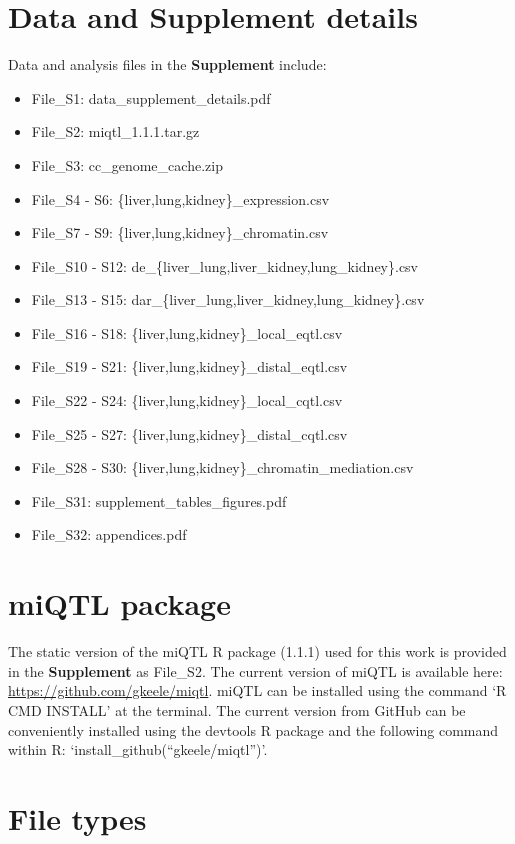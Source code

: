 \documentclass[10pt,letterpaper,twoside]{article}
\begin{document}
\section*{Data and Supplement details}

Data and analysis files in the \textbf{Supplement} include:

\begin{itemize}
	\item File\_S1: data\_supplement\_details.pdf
	\item File\_S2: miqtl\_1.1.1.tar.gz
	\item File\_S3: cc\_genome\_cache.zip
	\item File\_S4 - S6: \{liver,lung,kidney\}\_expression.csv
	\item File\_S7 - S9: \{liver,lung,kidney\}\_chromatin.csv
	\item File\_S10 - S12: de\_\{liver\_lung,liver\_kidney,lung\_kidney\}.csv
	\item File\_S13 - S15: dar\_\{liver\_lung,liver\_kidney,lung\_kidney\}.csv
	\item File\_S16 - S18: \{liver,lung,kidney\}\_local\_eqtl.csv
	\item File\_S19 - S21: \{liver,lung,kidney\}\_distal\_eqtl.csv
	\item File\_S22 - S24: \{liver,lung,kidney\}\_local\_cqtl.csv
	\item File\_S25 - S27: \{liver,lung,kidney\}\_distal\_cqtl.csv
	\item File\_S28 - S30: \{liver,lung,kidney\}\_chromatin\_mediation.csv
	\item File\_S31: supplement\_tables\_figures.pdf
	\item File\_S32: appendices.pdf
\end{itemize}

\section*{miQTL package}

The static version of the miQTL R package (1.1.1) used for this work is provided in the \textbf{Supplement} as File\_S2. The current version of miQTL is available here: \url{https://github.com/gkeele/miqtl}. miQTL can be installed using the command `R CMD INSTALL' at the terminal. The current version from GitHub can be conveniently installed using the devtools R package and the following command within R: `install\_github(``gkeele/miqtl'')'.

\section*{File types}
\end{document}
